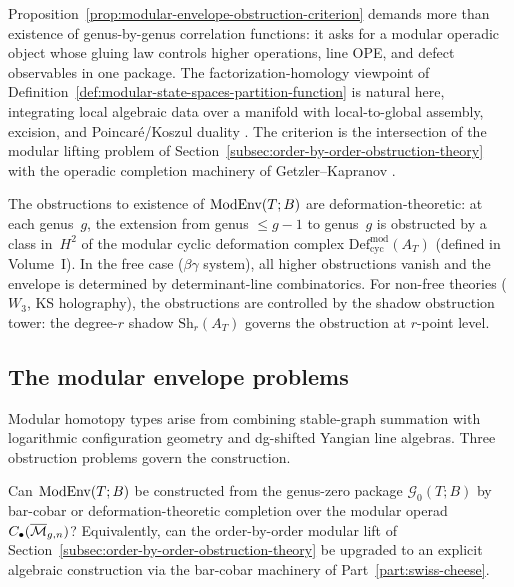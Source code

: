 \begin{remark}
\label{rem:modular-envelope-strength}
Proposition~\ref{prop:modular-envelope-obstruction-criterion} demands
more than existence of genus-by-genus correlation functions: it asks
for a modular operadic object whose gluing law controls higher
operations, line OPE, and defect observables in one package. The
factorization-homology viewpoint of
Definition~\ref{def:modular-state-spaces-partition-function} is natural
here, integrating local algebraic data over a manifold with
local-to-global assembly, excision, and Poincar\'e/Koszul duality
\cite{AF15}. The criterion is the intersection of the modular lifting
problem of
Section~\ref{subsec:order-by-order-obstruction-theory} with the
operadic completion machinery of Getzler--Kapranov \cite{GeK98}.

The obstructions to existence of $\operatorname{ModEnv}(T;B)$ are deformation-theoretic: at each genus~$g$,
the extension from genus $\leq g-1$ to genus~$g$ is obstructed by a class in~$H^2$ of the
modular cyclic deformation complex $\mathrm{Def}_{\mathrm{cyc}}^{\mathrm{mod}}(A_T)$
\textup{(}defined in Volume~I\textup{)}. In the free case
($\beta\gamma$ system), all higher obstructions vanish and the envelope is determined by
determinant-line combinatorics. For non-free theories ($W_3$, KS holography), the obstructions
are controlled by the shadow obstruction tower: the degree-$r$ shadow
$\mathrm{Sh}_r(A_T)$ governs the obstruction at $r$-point level.
\end{remark}

\subsection{The modular envelope problems}
\label{subsec:modular-envelope-problems}

Modular homotopy types arise from combining stable-graph summation
with logarithmic configuration geometry and dg-shifted Yangian line
algebras. Three obstruction problems govern the construction.

\begin{problem}[Existence]
\label{prob:modular-envelope-existence}
Can $\operatorname{ModEnv}(T;B)$ be constructed from the genus-zero package
$\mathcal G_0(T;B)$ by bar-cobar or deformation-theoretic completion
over the modular operad $C_\bullet(\overline{\mathcal M}_{g,n})$? Equivalently, can
the order-by-order modular lift of
Section~\ref{subsec:order-by-order-obstruction-theory} be upgraded to
an explicit algebraic construction via the bar-cobar machinery of
Part~\ref{part:swiss-cheese}.
\end{problem}


